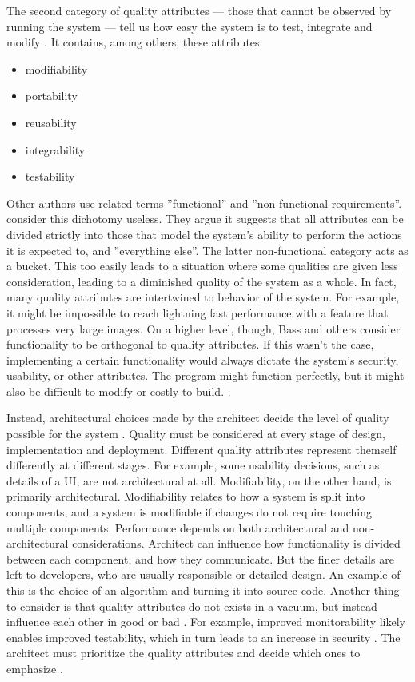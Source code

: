\documentclass[utf8,english]{gradu3}
\begin{document}
The second category of quality attributes --- those that cannot be
  observed by running the system --- tell us how easy the system is to test,
integrate and modify \parencite[81]{Bass1998}. It contains, among others, these
attributes:
\begin{itemize}
  \item modifiability
  \item portability
  \item reusability
  \item integrability
  \item testability
\end{itemize}

Other authors use related terms ''functional'' and ''non-functional
requirements''. \textcite[76]{Bass1998} consider this dichotomy useless. They argue it
suggests that all attributes can be divided strictly into those that model the
system's ability to perform the actions it is expected to, and ''everything
else''. The latter non-functional category acts as a bucket. This too easily
leads to a situation where some qualities are given less consideration, leading
to a diminished quality of the system as a whole. In fact, many quality
attributes are intertwined to behavior of the system. For example, it might be
impossible to reach lightning fast performance with a feature that processes
very large images. On a higher level, though, Bass and others consider
functionality to be orthogonal to quality attributes. If this wasn't the case,
implementing a certain functionality would always dictate the system's security,
usability, or other attributes. The program might function perfectly, but it
might also be difficult to modify or costly to build. \parencite[77]{Bass1998}.

Instead, architectural choices made by the architect decide the level of quality
possible for the system \parencite[72]{Bass2003}. Quality must be considered at
every stage of design, implementation and deployment.
Different quality attributes represent themself differently at different stages.
For example, some usability decisions, such as details of a UI, are not
architectural at all. Modifiability, on the other hand, is primarily
architectural. Modifiability relates to how a system is split into components,
and a system is modifiable if changes do not require touching multiple
components. Performance depends on both architectural and non-architectural
considerations. Architect can influence how functionality is divided between
each component, and how they communicate. But the finer details are left to
developers, who are usually responsible or detailed design. An example of this
is the choice of an algorithm and turning it into source code. Another thing to
consider is that quality attributes do not exists in a vacuum, but instead
influence each other in good or bad \parencite[78]{Bass1998}. For example,
improved monitorability likely enables improved testability, which in turn leads
to an increase in security \parencite[18]{Li2021}. The architect must prioritize the
quality attributes and decide which ones to emphasize \parencite[129]{Bass1998}.
\end{document}
